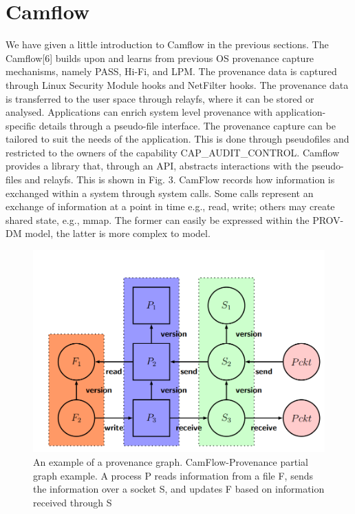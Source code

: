 


\section{Camflow}
We have given a little introduction to Camflow in the previous sections. The Camflow[6] builds upon and learns from previous
OS provenance capture mechanisms, namely PASS, Hi-Fi,
and LPM. The provenance data is captured through Linux
Security Module hooks and NetFilter hooks. The provenance data is transferred to the user space through relayfs,
where it can be stored or analysed. Applications can enrich system level provenance with application-specific details
through a pseudo-file interface. The provenance capture can
be tailored to suit the needs of the application. This is
done through pseudofiles and restricted to the owners of the
capability CAP\_AUDIT\_CONTROL. Camflow provides a library that,
through an API, abstracts interactions with the pseudo-files
and relayfs. This is shown in Fig. 3. 
\vskip 0.1in
CamFlow records how information is exchanged within a system
through system calls. Some calls represent an exchange of information at a point in time e.g., read, write; others may create shared
state, e.g., mmap. The former can easily be expressed within the
PROV-DM model, the latter is more complex to model.
\begin{figure}
	\centering
	\includegraphics[width=0.7\linewidth]{provenance-g}
	\caption{An example of a provenance graph. CamFlow-Provenance partial graph example. A process P reads information from a file F, sends the information
		over a socket S, and updates F based on information received
		through S}
	\label{fig:provenance-g}
\end{figure}

